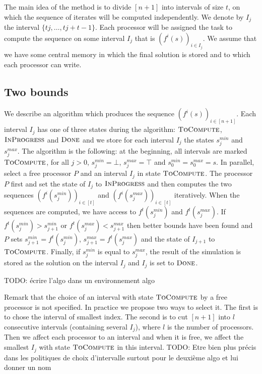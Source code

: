 \documentclass[a4paper,10pt]{article}
\newcommand{\todo}[1]{{\color{red} TODO: {#1}}}
\begin{document}
The main idea of the method is to divide $[n+1]$ into intervals of size $t$, on which the sequence of iterates will 
be computed independently.
We denote by $I_j$ the interval $\{tj, \dots, tj + t -1\}$. Each processor will be assigned the task to compute 
the sequence on some interval $I_j$ that is $(f^i(s))_{i \in I_j}$. We assume that we have some central memory in which the final solution is stored and to which each processor can write.


\subsection{Two bounds}

We describe an algorithm which produces the sequence  $(f^i(s))_{i\in [n+1]}$. Each interval $I_j$ has one of three states during the algorithm: $\textsc{ToCompute}$, $\textsc{InProgress}$ and $\textsc{Done}$ and we store for each interval $I_j$ the states $s_j^{min}$ and $s_j^{max}$.
The algorithm is the following: at the beginning, all intervals are marked $\textsc{ToCompute}$, for all $j >0$, 
$s_j^{min} = \bot$, $s_j^{max} = \top$ and $s_0^{min} = s_0^{max} = s$. 
In parallel, select a free processor $P$ and an interval $I_j$ in state $\textsc{ToCompute}$. 
The processor $P$ first and set the state of $I_j$ to $\textsc{InProgress}$ and then computes the two sequences $(f^i(s_j^{min}))_{i \in [t]}$ and $(f^i(s_j^{max}))_{i \in [t]}$ iteratively. When the sequences are computed, we have access to $f^t(s_j^{min})$ and 
 $f^t(s_j^{max})$. If $f^t(s_j^{min}) > s_{j+1}^{min}$ or $f^t(s_j^{max}) < s_{j+1}^{max}$ then better bounds have been found and $P$ sets $s_{j+1}^{min} = f^t(s_j^{min})$, $s_{j+1}^{max} = f^t(s_j^{max})$ and the state of $I_{j+1}$ to $\textsc{ToCompute}$.
Finally, if $s_j^{min}$ is equal to $s_j^{max}$, the result of the simulation is stored as the solution on the interval $I_j$
and $I_j$ is set to $\textsc{Done}$.

 \todo{écrire l'algo dans un environnement algo}
 
Remark that the choice of an interval with state $\textsc{ToCompute}$ by a free processor is not specified. 
In practice we propose two ways to select it. The first is to chose the interval of smallest index. 
The second is to cut $[n+1]$ into $l$ consecutive intervals (containing several $I_j$), where $l$ is the number of processors. 
Then we affect each processor to an interval and when it is free, we affect the smallest $I_j$ with state $\textsc{ToCompute}$ in this interval.  
 \todo{Etre bien plus précis dans les politiques de choix d'intervalle surtout pour le deuxième algo et lui donner un nom}
 
\end{document}

